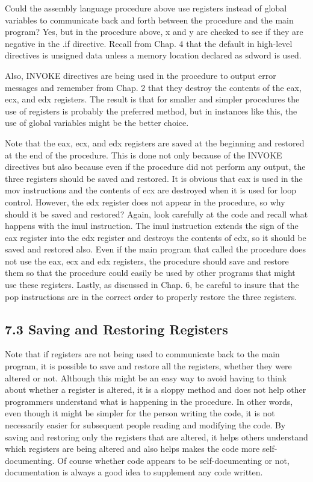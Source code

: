 \documentclass[10pt]{article}
\begin{document}
Could the assembly language procedure above use registers instead of global variables to communicate back and forth between the procedure and the main program? Yes, but in the procedure above, x and y are checked to see if they are negative in the .if directive. Recall from Chap. 4 that the default in high-level directives is unsigned data unless a memory location declared as sdword is used.

Also, INVOKE directives are being used in the procedure to output error messages and remember from Chap. 2 that they destroy the contents of the eax, ecx, and edx registers. The result is that for smaller and simpler procedures the use of registers is probably the preferred method, but in instances like this, the use of global variables might be the better choice.

Note that the eax, ecx, and edx registers are saved at the beginning and restored at the end of the procedure. This is done not only because of the INVOKE directives but also because even if the procedure did not perform any output, the three registers should be saved and restored. It is obvious that eax is used in the mov instructions and the contents of ecx are destroyed when it is used for loop control. However, the edx register does not appear in the procedure, so why should it be saved and restored? Again, look carefully at the code and recall what happens with the imul instruction. The imul instruction extends the sign of the eax register into the edx register and destroys the contents of edx, so it should be saved and restored also. Even if the main program that called the procedure does not use the eax, ecx and edx registers, the procedure should save and restore them so that the procedure could easily be used by other programs that might use these registers. Lastly, as discussed in Chap. 6, be careful to insure that the pop instructions are in the correct order to properly restore the three registers.

\subsection*{7.3 Saving and Restoring Registers}
Note that if registers are not being used to communicate back to the main program, it is possible to save and restore all the registers, whether they were altered or not. Although this might be an easy way to avoid having to think about whether a register is altered, it is a sloppy method and does not help other programmers understand what is happening in the procedure. In other words, even though it might be simpler for the person writing the code, it is not necessarily easier for subsequent people reading and modifying the code. By saving and restoring only the registers that are altered, it helps others understand which registers are being altered and also helps makes the code more self-documenting. Of course whether code appears to be self-documenting or not, documentation is always a good idea to supplement any code written.
\end{document}
